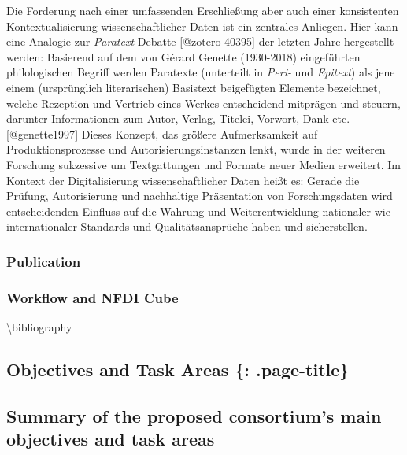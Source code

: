 Die Forderung nach einer umfassenden Erschließung aber auch einer
konsistenten Kontextualisierung wissenschaftlicher Daten ist ein
zentrales Anliegen. Hier kann eine Analogie zur \emph{Paratext}-Debatte
{[}@zotero-40395{]} der letzten Jahre hergestellt werden: Basierend auf
dem von Gérard Genette (1930-2018) eingeführten philologischen Begriff
werden Paratexte (unterteilt in \emph{Peri-} und \emph{Epitext}) als
jene einem (ursprünglich literarischen) Basistext beigefügten Elemente
bezeichnet, welche Rezeption und Vertrieb eines Werkes entscheidend
mitprägen und steuern, darunter Informationen zum Autor, Verlag,
Titelei, Vorwort, Dank etc.{[}@genette1997{]} Dieses Konzept, das
größere Aufmerksamkeit auf Produktionsprozesse und
Autorisierungsinstanzen lenkt, wurde in der weiteren Forschung
sukzessive um Textgattungen und Formate neuer Medien erweitert. Im
Kontext der Digitalisierung wissenschaftlicher Daten heißt es: Gerade
die Prüfung, Autorisierung und nachhaltige Präsentation von
Forschungsdaten wird entscheidenden Einfluss auf die Wahrung und
Weiterentwicklung nationaler wie internationaler Standards und
Qualitätsansprüche haben und sicherstellen.

\hypertarget{publication}{%
\subsubsection{Publication}\label{publication}}

\hypertarget{workflow-and-nfdi-cube}{%
\subsubsection{Workflow and NFDI Cube}\label{workflow-and-nfdi-cube}}

\textbackslash bibliography

\hypertarget{objectives-and-task-areas-.page-title}{%
\subsection{Objectives and Task Areas \{:
.page-title\}}\label{objectives-and-task-areas-.page-title}}

\hypertarget{summary-of-the-proposed-consortiums-main-objectives-and-task-areas}{%
\subsection{Summary of the proposed consortium's main objectives and
task
areas}\label{summary-of-the-proposed-consortiums-main-objectives-and-task-areas}}

